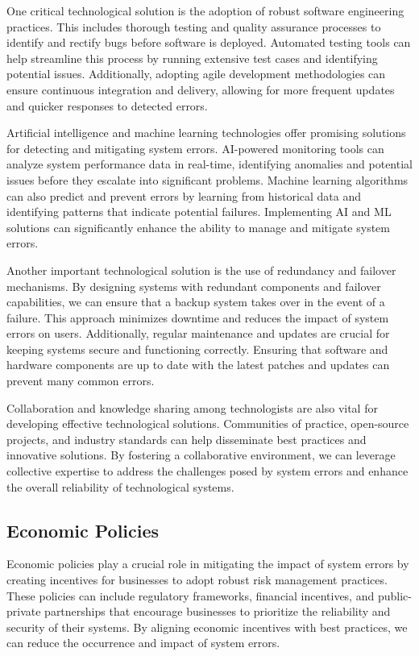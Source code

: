 \documentclass[10pt, conference, letterpaper]{IEEEtran}
\begin{document}
One critical technological solution is the adoption of robust software engineering practices. This includes thorough testing and quality assurance processes to identify and rectify bugs before software is deployed. Automated testing tools can help streamline this process by running extensive test cases and identifying potential issues. Additionally, adopting agile development methodologies can ensure continuous integration and delivery, allowing for more frequent updates and quicker responses to detected errors.

Artificial intelligence and machine learning technologies offer promising solutions for detecting and mitigating system errors. AI-powered monitoring tools can analyze system performance data in real-time, identifying anomalies and potential issues before they escalate into significant problems. Machine learning algorithms can also predict and prevent errors by learning from historical data and identifying patterns that indicate potential failures. Implementing AI and ML solutions can significantly enhance the ability to manage and mitigate system errors.

Another important technological solution is the use of redundancy and failover mechanisms. By designing systems with redundant components and failover capabilities, we can ensure that a backup system takes over in the event of a failure. This approach minimizes downtime and reduces the impact of system errors on users. Additionally, regular maintenance and updates are crucial for keeping systems secure and functioning correctly. Ensuring that software and hardware components are up to date with the latest patches and updates can prevent many common errors.

Collaboration and knowledge sharing among technologists are also vital for developing effective technological solutions. Communities of practice, open-source projects, and industry standards can help disseminate best practices and innovative solutions. By fostering a collaborative environment, we can leverage collective expertise to address the challenges posed by system errors and enhance the overall reliability of technological systems.

\subsection{Economic Policies}
Economic policies play a crucial role in mitigating the impact of system errors by creating incentives for businesses to adopt robust risk management practices. These policies can include regulatory frameworks, financial incentives, and public-private partnerships that encourage businesses to prioritize the reliability and security of their systems. By aligning economic incentives with best practices, we can reduce the occurrence and impact of system errors.
\end{document}
